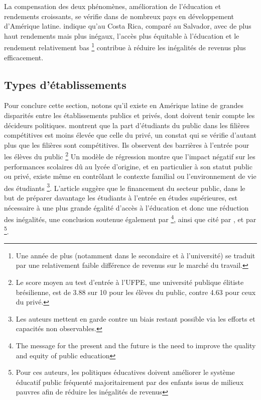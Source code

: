\documentclass[pagesize, twoside=off, bibliography=totoc, DIV=calc, fontsize=12pt, a4paper, french]{scrartcl}
\begin{document}
La compensation des deux phénomènes, amélioration de l’éducation et rendements croissants, se vérifie dans de nombreux pays en développement d’Amérique latine.  indique qu’au Costa Rica, comparé au Salvador, avec de plus haut rendements mais plus inégaux, l’accès plus équitable à l’éducation et le rendement relativement bas \footnote{Une année de plus (notamment dans le secondaire et à l’université) se traduit par une relativement faible différence de revenus sur le marché du travail.} contribue à réduire les inégalités de revenus plus efficacement. 

\subsection{Types d’établissements}

Pour conclure cette section, notons qu’il existe en Amérique latine de grandes disparités entre les établissements publics et privés, dont doivent tenir compte les décideurs politiques. 
 montrent que la part d’étudiants du public dans les filières compétitives est moins élevée que celle du privé, un constat qui se vérifie d’autant plus que les filières sont compétitives. 
Ils observent des barrières à l’entrée pour les élèves du public 
\footnote{Le score moyen au test d’entrée à l’UFPE, une université publique élitiste brésilienne, est de 3.88 sur 10 pour les élèves du public, contre 4.63 pour ceux du privé.} Un modèle de régression montre que l’impact négatif sur les performances scolaires dû au lycée d’origine, et en particulier à son statut public ou privé, existe même en contrôlant le contexte familial ou l’environnement de vie des étudiants \footnote{Les auteurs mettent en garde contre un biais restant possible via les efforts et capacités non observables.}. 
L’article suggère que le financement du secteur public, dans le but de préparer davantage les étudiants à l’entrée en études supérieures, est nécessaire à une plus grande égalité d’accès à l’éducation et donc une réduction des inégalités, une conclusion soutenue également par \citet{bravo_competencias_2011} \footnote{\og{}The message for the present and the future is the need to improve the quality and equity of public education\fg{}}, ainsi que cité par \citet{carlson_education_2002}, et par \citet{ferreira_rise_2008} \footnote{Pour ces auteurs, les politiques éducatives doivent améliorer le système éducatif public fréquenté majoritairement par des enfants issus de milieux pauvres afin de réduire les inégalités de revenus}.
\end{document}
